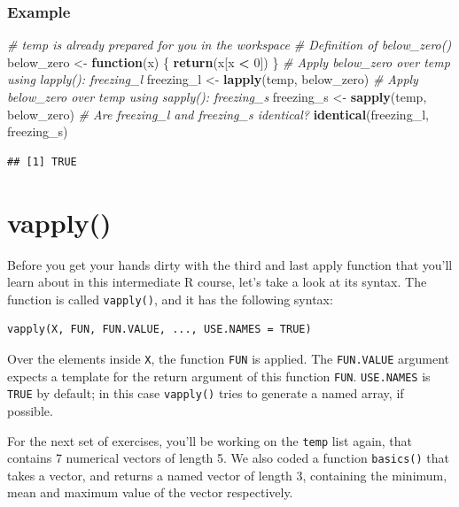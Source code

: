 \documentclass[
]{book}
\newenvironment{Shaded}{\begin{snugshade}}{\end{snugshade}}
\newcommand{\CommentTok}[1]{\textcolor[rgb]{0.56,0.35,0.01}{\textit{#1}}}
\newcommand{\ControlFlowTok}[1]{\textcolor[rgb]{0.13,0.29,0.53}{\textbf{#1}}}
\newcommand{\DecValTok}[1]{\textcolor[rgb]{0.00,0.00,0.81}{#1}}
\newcommand{\KeywordTok}[1]{\textcolor[rgb]{0.13,0.29,0.53}{\textbf{#1}}}
\newcommand{\NormalTok}[1]{#1}
\newcommand{\OperatorTok}[1]{\textcolor[rgb]{0.81,0.36,0.00}{\textbf{#1}}}
\newcommand{\StringTok}[1]{\textcolor[rgb]{0.31,0.60,0.02}{#1}}
\begin{document}
\hypertarget{example-6}{%
\subsubsection{Example}\label{example-6}}

\begin{Shaded}
\begin{Highlighting}[]
\CommentTok{# temp is already prepared for you in the workspace}
\CommentTok{# Definition of below_zero()}
\NormalTok{below_zero <-}\StringTok{ }\ControlFlowTok{function}\NormalTok{(x) \{}
  \KeywordTok{return}\NormalTok{(x[x }\OperatorTok{<}\StringTok{ }\DecValTok{0}\NormalTok{])}
\NormalTok{\}}
\CommentTok{# Apply below_zero over temp using lapply(): freezing_l}
\NormalTok{freezing_l <-}\StringTok{ }\KeywordTok{lapply}\NormalTok{(temp, below_zero)}
\CommentTok{# Apply below_zero over temp using sapply(): freezing_s}
\NormalTok{freezing_s <-}\StringTok{ }\KeywordTok{sapply}\NormalTok{(temp, below_zero)}
\CommentTok{# Are freezing_l and freezing_s identical?}
\KeywordTok{identical}\NormalTok{(freezing_l, freezing_s)}
\end{Highlighting}
\end{Shaded}

\begin{verbatim}
## [1] TRUE
\end{verbatim}

\hypertarget{vapply}{%
\section{vapply()}\label{vapply}}

Before you get your hands dirty with the third and last apply function that you'll learn about in this intermediate R course, let's take a look at its syntax. The function is called \texttt{vapply()}, and it has the following syntax:

\begin{verbatim}
vapply(X, FUN, FUN.VALUE, ..., USE.NAMES = TRUE)
\end{verbatim}

Over the elements inside \texttt{X}, the function \texttt{FUN} is applied. The \texttt{FUN.VALUE} argument expects a template for the return argument of this function \texttt{FUN}. \texttt{USE.NAMES} is \texttt{TRUE} by default; in this case \texttt{vapply()} tries to generate a named array, if possible.

For the next set of exercises, you'll be working on the \texttt{temp} list again, that contains 7 numerical vectors of length 5. We also coded a function \texttt{basics()} that takes a vector, and returns a named vector of length 3, containing the minimum, mean and maximum value of the vector respectively.
\end{document}
